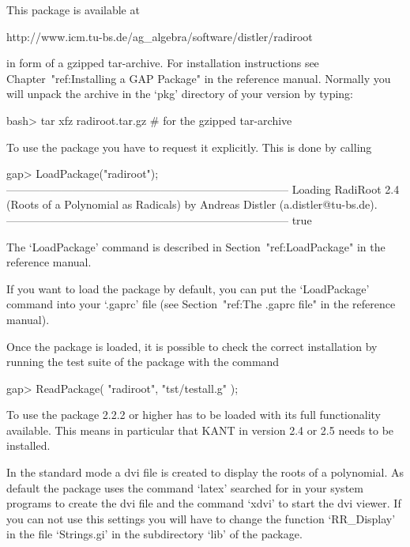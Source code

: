 


This package is available at

\begintt
http://www.icm.tu-bs.de/ag_algebra/software/distler/radiroot
\endtt

in form of a gzipped tar-archive. For installation instructions see
Chapter~"ref:Installing a GAP Package" in the {\GAP} reference manual. 
Normally you will unpack the archive in the `pkg' directory of your
{\GAP} version by typing:

\beginexample
    bash> tar xfz radiroot.tar.gz        # for the gzipped tar-archive
\endexample


To use the {\Radiroot} package you have to request it explicitly. This  is
done by calling

\beginexample
gap> LoadPackage("radiroot");
-----------------------------------------------------------------------------
Loading  RadiRoot 2.4 (Roots of a Polynomial as Radicals)
by Andreas Distler (a.distler@tu-bs.de).
-----------------------------------------------------------------------------
true
\endexample

The `LoadPackage' command is described  in  Section~"ref:LoadPackage"  in
the {\GAP} reference manual.

If you want to load the {\Radiroot} package by default, you  can  put  the
`LoadPackage' command  into  your  `.gaprc'  file  (see  Section~"ref:The
.gaprc file" in the {\GAP} reference manual).

Once the package is loaded, it is possible to check the correct
    installation by running the test suite of the package with the command

\beginexample
    gap> ReadPackage( "radiroot", "tst/testall.g" );
\endexample


To use {\Radiroot} the package {\Alnuth} 2.2.2 or higher has to be
loaded with its full functionality available. This means in particular
that KANT \cite{KANT} in version 2.4 or 2.5 needs to be installed.

In the standard mode a dvi file is created to display the roots of a
polynomial. As default the package uses the command `latex' searched
for in your system programs to create the dvi file and the command
`xdvi' to start the dvi viewer. If you can not use this settings you
will have to change the function `RR_Display' in the file `Strings.gi'
in the subdirectory `lib' of the package.

